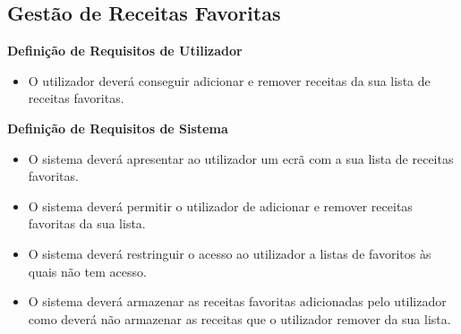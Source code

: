\documentclass[a4paper]{report}
\begin{document}
        \subsection{Gestão de Receitas Favoritas}
            \textbf{Definição de Requisitos de Utilizador}
            \begin{itemize}
                \item O utilizador deverá conseguir adicionar e remover
                receitas da sua lista de receitas favoritas.
            \end{itemize}
            \textbf{Definição de Requisitos de Sistema}
            \begin{itemize}
                \item O sistema deverá apresentar ao utilizador um ecrã
                com a sua lista de receitas favoritas.
                \item O sistema deverá permitir o utilizador de adicionar e
                remover receitas favoritas da sua lista.
                \item O sistema deverá restringuir o acesso ao utilizador
                a listas de favoritos às quais não tem acesso.
                \item O sistema deverá armazenar as receitas favoritas 
                adicionadas pelo utilizador como deverá não armazenar as 
                receitas que o utilizador remover da sua lista. 
            \end{itemize}
\end{document}
